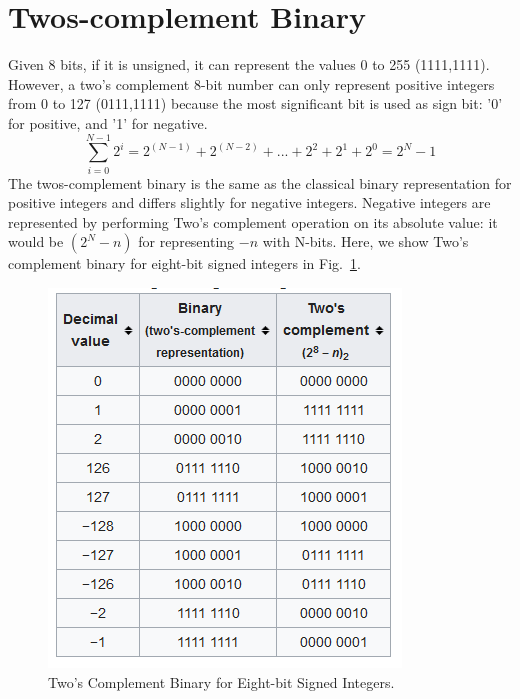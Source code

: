\documentclass[../main.tex]{subfiles}
\begin{document}
\section{Twos-complement Binary} 
Given 8 bits, if it is unsigned, it can represent the values 0 to 255 (1111,1111). However, a two's complement 8-bit number can only represent positive integers from 0 to 127 (0111,1111) because the most significant bit is used as sign bit: '0' for positive, and '1' for negative. 
\begin{equation}
  \sum_{i=0}^{N-1} 2^i =  2^{(N-1)}+2^{(N-2)}+...+2^2+2^1+2^0= 2^N-1
\end{equation}
The twos-complement binary is the same as the classical binary representation for positive integers and differs slightly for negative integers. Negative integers are represented by performing Two's complement operation on its absolute value: it would be $(2^N-n)$ for representing $-n$ with N-bits. 
Here, we show Two's complement binary for eight-bit signed integers in Fig.~\ref{fig:twos_complement}.  
\begin{figure}
    \centering
    \includegraphics[width=0.6\columnwidth]{fig/eight_bit_two_complement.png}
    \caption{Two's Complement Binary for Eight-bit Signed Integers.}
    \label{fig:twos_complement}
\end{figure}
\end{document}
